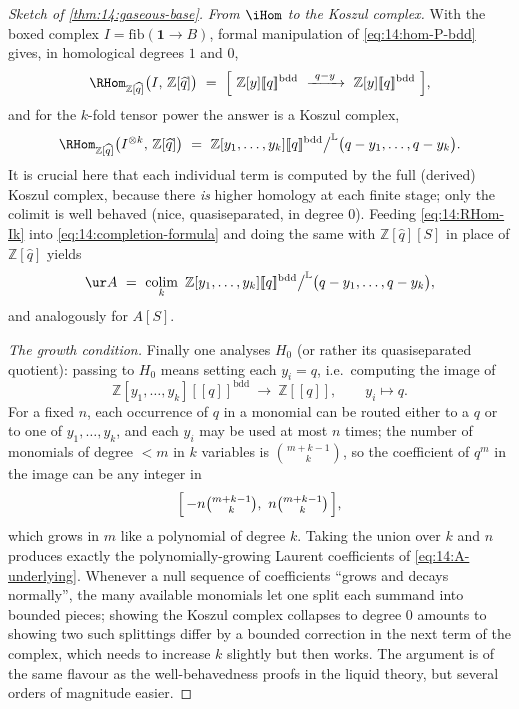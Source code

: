 \begin{proof}[Sketch of \cref{thm:14:gaseous-base}]
\emph{From $\iHom$ to the Koszul complex.} With the boxed complex
$I=\mathrm{fib}(\mathbf 1\to B)$, formal manipulation of \eqref{eq:14:hom-P-bdd}
gives, in homological degrees $1$ and $0$,
\begin{equation}
\label{eq:14:RHom-I}
\RHom_{\mathbb{Z}[\widehat q]}\bigl(I,\,\mathbb{Z}[\widehat q]\bigr)\ =\ \Bigl[\ \mathbb{Z}[y][\![q]\!]^{\mathrm{bdd}}\ \xrightarrow{\ q-y\ }\ \mathbb{Z}[y][\![q]\!]^{\mathrm{bdd}}\ \Bigr],
\end{equation}
and for the $k$-fold tensor power the answer is a Koszul complex,
\begin{equation}
\label{eq:14:RHom-Ik}
\RHom_{\mathbb{Z}[\widehat q]}\bigl(I^{\otimes k},\,\mathbb{Z}[\widehat q]\bigr)\ =\ \mathbb{Z}[y_1,\dots,y_k][\![q]\!]^{\mathrm{bdd}}\big/^{\mathbb{L}}\bigl(q-y_1,\dots,q-y_k\bigr).
\end{equation}
It is crucial here that each individual term is computed by the full (derived)
Koszul complex, because there \emph{is} higher homology at each finite stage;
only the colimit is well behaved (nice, quasiseparated, in degree $0$). Feeding
\eqref{eq:14:RHom-Ik} into \eqref{eq:14:completion-formula} and doing the same with
$\mathbb{Z}[\widehat q][S]$ in place of $\mathbb{Z}[\widehat q]$ yields
\begin{equation}
\label{eq:14:A-colim}
\ur A\ =\ \operatorname*{colim}_k\ \mathbb{Z}[y_1,\dots,y_k][\![q]\!]^{\mathrm{bdd}}\big/^{\mathbb{L}}\bigl(q-y_1,\dots,q-y_k\bigr),
\end{equation}
and analogously for $A[S]$.

\emph{The growth condition.} Finally one analyses $H_0$ (or rather its
quasiseparated quotient): passing to $H_0$ means setting each $y_i=q$, i.e.\
computing the image of
\begin{equation*}
\mathbb{Z}[y_1,\dots,y_k][\![q]\!]^{\mathrm{bdd}}\ \longrightarrow\ \mathbb{Z}[\![q]\!],\qquad y_i\longmapsto q.
\end{equation*}
For a fixed $n$, each occurrence of $q$ in a monomial can be routed either to a
$q$ or to one of $y_1,\dots,y_k$, and each $y_i$ may be used at most $n$ times; the
number of monomials of degree $<m$ in $k$ variables is $\binom{m+k-1}{k}$, so the
coefficient of $q^m$ in the image can be any integer in
\begin{equation*}
\Bigl[\,-n\tbinom{m+k-1}{k},\ n\tbinom{m+k-1}{k}\,\Bigr],
\end{equation*}
which grows in $m$ like a polynomial of degree $k$. Taking the union over $k$ and
$n$ produces exactly the polynomially-growing Laurent coefficients of
\eqref{eq:14:A-underlying}. Whenever a null sequence of coefficients ``grows and
decays normally'', the many available monomials let one split each summand into
bounded pieces; showing the Koszul complex collapses to degree $0$ amounts to
showing two such splittings differ by a bounded correction in the next term of the
complex, which needs to increase $k$ slightly but then works. The argument is of
the same flavour as the well-behavedness proofs in the liquid theory, but several
orders of magnitude easier.
\end{proof}

